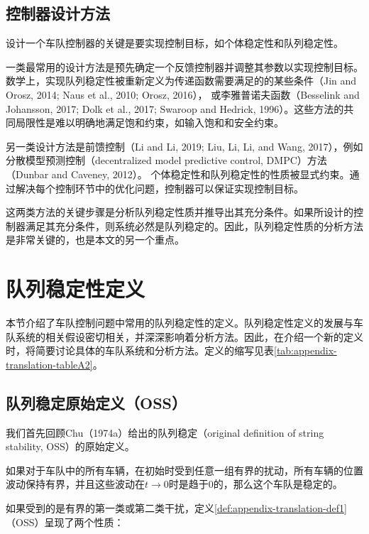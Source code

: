 \begin{translation}
\subsection{控制器设计方法}

设计一个车队控制器的关键是要实现控制目标，如个体稳定性和队列稳定性。

一类最常用的设计方法是预先确定一个反馈控制器并调整其参数以实现控制目标。数学上，实现队列稳定性被重新定义为传递函数需要满足的的某些条件（Jin and Orosz, 2014; Naus et al., 2010; Orosz, 2016），
或李雅普诺夫函数（Besselink and Johansson, 2017; Dolk et al., 2017; Swaroop and Hedrick, 1996）。这些方法的共同局限性是难以明确地满足饱和约束，如输入饱和和安全约束。

另一类设计方法是前馈控制（Li and Li, 2019; Liu, Li, Li, and Wang, 2017），例如分散模型预测控制（decentralized model predictive control, DMPC）方法（Dunbar and Caveney, 2012）。
个体稳定性和队列稳定性的性质被显式约束。通过解决每个控制环节中的优化问题，控制器可以保证实现控制目标。

这两类方法的关键步骤是分析队列稳定性质并推导出其充分条件。如果所设计的控制器满足其充分条件，则系统必然是队列稳定的。因此，队列稳定性质的分析方法是非常关键的，也是本文的另一个重点。

\section{队列稳定性定义}

本节介绍了车队控制问题中常用的队列稳定性的定义。队列稳定性定义的发展与车队系统的相关假设密切相关，并深深影响着分析方法。因此，在介绍一个新的定义时，将简要讨论具体的车队系统和分析方法。定义的缩写见表\ref{tab:appendix-translation-tableA2}。

\subsection{队列稳定原始定义（OSS）}

我们首先回顾Chu（1974a）给出的队列稳定（original definition of string stability, OSS）的原始定义。

\begin{definition}[OSS]
  如果对于车队中的所有车辆，在初始时受到任意一组有界的扰动，所有车辆的位置波动保持有界，并且这些波动在$t \rightarrow 0$时是趋于0的，那么这个车队是稳定的。
  \label{def:appendix-translation-def1}
\end{definition}

如果受到的是有界的第一类或第二类干扰，定义\ref{def:appendix-translation-def1}（OSS）呈现了两个性质：


\end{translation}
